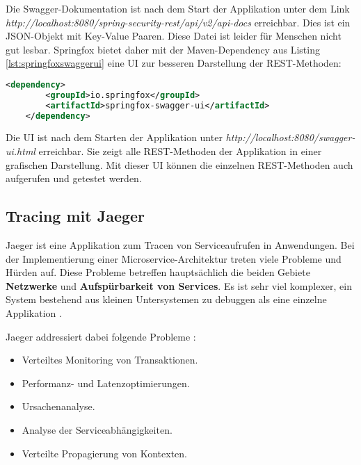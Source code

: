 Die Swagger-Dokumentation ist nach dem Start der Applikation unter dem Link \textit{http://localhost:8080/spring-security-rest/api/v2/api-docs} erreichbar. Dies ist ein JSON-Objekt mit Key-Value Paaren. Diese Datei ist leider für Menschen nicht gut lesbar.
Springfox bietet daher mit der Maven-Dependency aus Listing \ref{lst:springfoxswaggerui} eine UI zur besseren Darstellung der REST-Methoden:

\begin{lstlisting}[language=xml, caption=pom.xml, label=lst:springfoxswaggerui]
	<dependency>
		<groupId>io.springfox</groupId>
		<artifactId>springfox-swagger-ui</artifactId>
	</dependency>
\end{lstlisting}

Die UI ist nach dem Starten der Applikation unter \textit{http://localhost:8080/swagger-ui.html} erreichbar. Sie zeigt alle REST-Methoden der Applikation in einer grafischen Darstellung. Mit dieser UI können die einzelnen REST-Methoden auch aufgerufen und getestet werden.

\subsection{Tracing mit Jaeger}
\label{sec:tracingwithjaeger}
Jaeger ist eine Applikation zum Tracen von Serviceaufrufen in Anwendungen. Bei der Implementierung einer Microservice-Architektur treten viele Probleme und Hürden auf. Diese Probleme betreffen hauptsächlich die beiden Gebiete \textbf{Netzwerke} und \textbf{Aufspürbarkeit von Services}. Es ist sehr viel komplexer, ein System bestehend aus kleinen Untersystemen zu debuggen als eine einzelne Applikation \cite{jaeger}.

Jaeger addressiert dabei folgende Probleme \cite{jaeger}:
\begin{itemize}
	\item Verteiltes Monitoring von Transaktionen.
	\item Performanz- und Latenzoptimierungen.
	\item Ursachenanalyse.
	\item Analyse der Serviceabhängigkeiten.
	\item Verteilte Propagierung von Kontexten.
\end{itemize}

